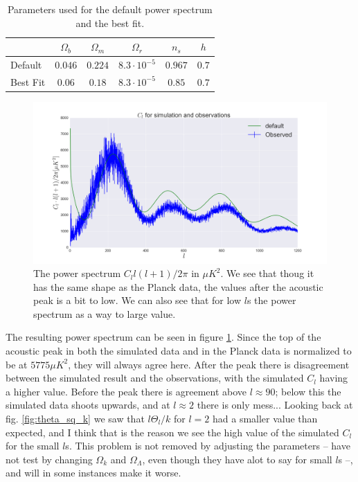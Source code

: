 \documentclass[a4paper,norsk, 10pt]{article}
\begin{document}
\begin{table}[!htb]
\centering
\begin{tabular}{l c c c c c}
& $\Omega_b$ & $\Omega_m$ & $\Omega_r$ & $n_s$ & $h$ \\
\hline 
Default & $0.046$ & $0.224$ & $8.3\cdot 10^{-5}$ & $0.967$ & $0.7$ \\
Best Fit & $0.06$ & $0.18$ & $8.3\cdot 10^{-5}$ & $0.85$ & $0.7$ \\

\end{tabular}
\caption{Parameters used for the default power spectrum and the best fit.}\label{tab:parameters}
\end{table}

\begin{figure}[!htp]
\centering
\includegraphics[scale=0.25]{Cl.png}
\caption{The power spectrum $C_l l(l+1)/2\pi$ in $\mu K^2$. We see that thoug it has the same shape as the Planck data, the values after the acoustic peak is a bit to low. We can also see that for low $l$s the power spectrum as a way to large value.}\label{fig:Cl_default}
\end{figure}

The resulting power spectrum can be seen in figure \ref{fig:Cl_default}. Since the top of the acoustic peak in both the simulated data and in the Planck data is normalized to be at $5775 \mu K^2$, they will always agree here. After the peak there is disagreement between the simulated result and the observations, with the simulated $C_l$ having a higher value. Before the peak there is agreement above $l \approx 90$; below this the simulated data shoots upwards, and at $l \approx 2$ there is only mess... Looking back at fig. \ref{fig:theta_sq_k} we saw that $l\Theta_l/k$ for $l=2$ had a smaller value than expected, and I think that is the reason we see the high value of the simulated $C_l$ for the small $l$s. This problem is not removed by adjusting the parameters -- have not test by changing $\Omega_k$ and $\Omega_{\Lambda}$, even though they have alot to say for small $l$s --, and will in some instances make it worse. 
\end{document}
